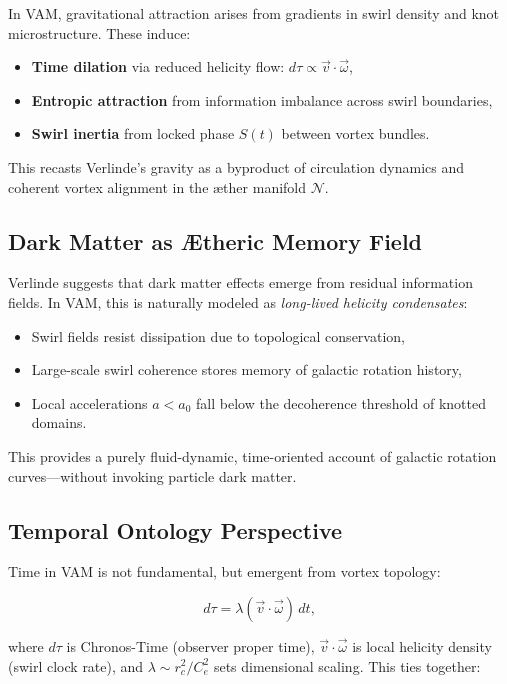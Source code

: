 \documentclass[12pt]{article}
\begin{document}
In VAM, gravitational attraction arises from gradients in swirl density and knot microstructure. These induce:

\begin{itemize}
    \item \textbf{Time dilation} via reduced helicity flow: \( d\tau \propto \vec{v} \cdot \vec{\omega} \),
    \item \textbf{Entropic attraction} from information imbalance across swirl boundaries,
    \item \textbf{Swirl inertia} from locked phase \( S(t) \) between vortex bundles.
\end{itemize}

This recasts Verlinde’s gravity as a byproduct of circulation dynamics and coherent vortex alignment in the æther manifold \( \mathcal{N} \).

\subsection*{Dark Matter as Ætheric Memory Field}

Verlinde suggests that dark matter effects emerge from residual information fields. In VAM, this is naturally modeled as \emph{long-lived helicity condensates}:

\begin{itemize}
    \item Swirl fields resist dissipation due to topological conservation,
    \item Large-scale swirl coherence stores memory of galactic rotation history,
    \item Local accelerations \( a < a_0 \) fall below the decoherence threshold of knotted domains.
\end{itemize}

This provides a purely fluid-dynamic, time-oriented account of galactic rotation curves—without invoking particle dark matter.

\subsection*{Temporal Ontology Perspective}

Time in VAM is not fundamental, but emergent from vortex topology:

\begin{equation}
d\tau = \lambda (\vec{v} \cdot \vec{\omega}) \, dt,
\end{equation}

where \( d\tau \) is Chronos-Time (observer proper time), \( \vec{v} \cdot \vec{\omega} \) is local helicity density (swirl clock rate), and \( \lambda \sim r_c^2 / C_e^2 \) sets dimensional scaling. This ties together:
\end{document}
